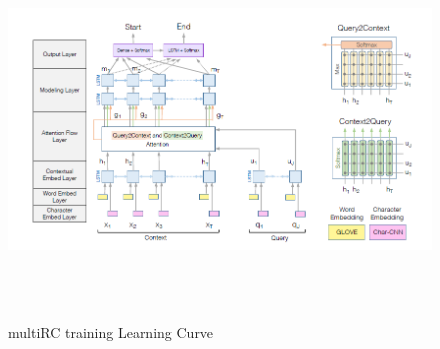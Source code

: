 \documentclass[12pt, a4paper]{article}
\begin{document}
	\begin{figure}
		\includegraphics[width=\textwidth,height=10cm]{images/bidaf.png}
		\caption{multiRC training Learning Curve}
	\end{figure}

	\printbibliography

	
\end{document}
